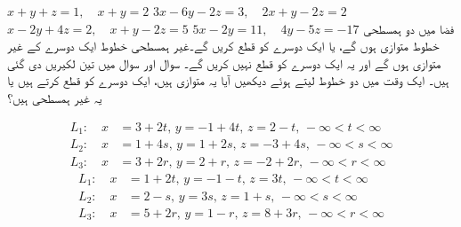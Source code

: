 $x+y+z=1,\quad x+y=2$
$3x-6y-2z=3,\quad 2x+y-2z=2$
$x-2y+4z=2,\quad x+y-2z=5$
$5x-2y=11,\quad 4y-5z=-17$
فضا میں  دو ہمسطحی   خطوط متوازی ہوں گے،  یا  ایک دوسرے کو قطع کریں گے۔غیر ہمسطحی خطوط ایک دوسرے کے غیر متوازی ہوں گے اور یہ ایک دوسرے کو قطع نہیں کریں گے۔ سوال  اور سوال  میں تین لکیریں  دی گئی ہیں۔  ایک وقت میں دو خطوط  لیتے ہوئے دیکھیں آیا یہ متوازی ہیں،   ایک دوسرے کو قطع کرتے ہیں یا یہ غیر ہمسطحی ہیں؟

\begin{align*}
L_1:\quad x&=3+2t,\,y=-1+4t,\,z=2-t,\,-\infty<t<\infty\\
L_2:\quad x&=1+4s,\,y=1+2s,\,z=-3+4s,\,-\infty<s<\infty\\
L_3:\quad x&=3+2r,\, y=2+r,\,z=-2+2r,\,-\infty<r<\infty
\end{align*}
\begin{align*}
L_1:\quad x&=1+2t,\,y=-1-t,\,z=3t,\,-\infty<t<\infty\\
L_2:\quad x&=2-s,\,y=3s,\,z=1+s,\,-\infty<s<\infty\\
L_3:\quad x&=5+2r,\,y=1-r,\,z=8+3r,\,-\infty<r<\infty
\end{align*}

